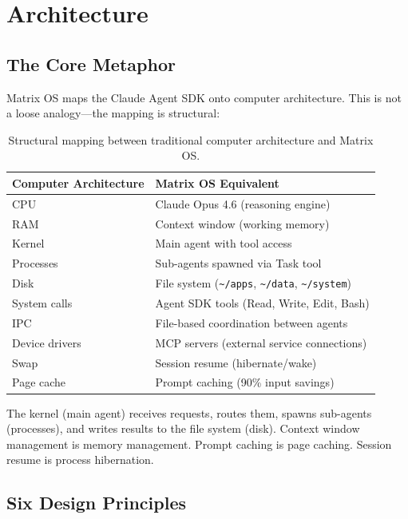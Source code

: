 \documentclass[11pt,a4paper]{article}
\begin{document}
\section{Architecture}

\subsection{The Core Metaphor}

Matrix OS maps the Claude Agent SDK onto computer architecture. This is not a loose analogy---the mapping is structural:

\begin{table}[h]
\centering
\begin{tabular}{@{}ll@{}}
\toprule
\textbf{Computer Architecture} & \textbf{Matrix OS Equivalent} \\
\midrule
CPU & Claude Opus 4.6 (reasoning engine) \\
RAM & Context window (working memory) \\
Kernel & Main agent with tool access \\
Processes & Sub-agents spawned via Task tool \\
Disk & File system (\texttt{\textasciitilde/apps}, \texttt{\textasciitilde/data}, \texttt{\textasciitilde/system}) \\
System calls & Agent SDK tools (Read, Write, Edit, Bash) \\
IPC & File-based coordination between agents \\
Device drivers & MCP servers (external service connections) \\
Swap & Session resume (hibernate/wake) \\
Page cache & Prompt caching (90\% input savings) \\
\bottomrule
\end{tabular}
\caption{Structural mapping between traditional computer architecture and Matrix OS.}
\label{tab:mapping}
\end{table}

The kernel (main agent) receives requests, routes them, spawns sub-agents (processes), and writes results to the file system (disk). Context window management is memory management. Prompt caching is page caching. Session resume is process hibernation.

\subsection{Six Design Principles}
\end{document}
